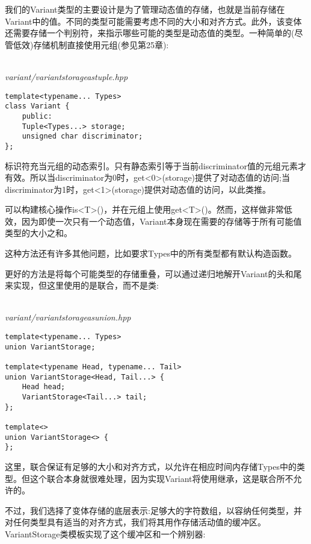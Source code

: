 我们的Variant类型的主要设计是为了管理动态值的存储，也就是当前存储在Variant中的值。不同的类型可能需要考虑不同的大小和对齐方式。此外，该变体还需要存储一个判别符，来指示哪些可能的类型是动态值的类型。一种简单的(尽管低效)存储机制直接使用元组(参见第25章):

\hspace*{\fill} \\ %
\noindent
\textit{variant/variantstorageastuple.hpp}
\begin{lstlisting}[style=styleCXX]
template<typename... Types>
class Variant {
	public:
	Tuple<Types...> storage;
	unsigned char discriminator;
};
\end{lstlisting}

标识符充当元组的动态索引。只有静态索引等于当前discriminator值的元组元素才有效。所以当discriminator为0时，get<0>(storage)提供了对动态值的访问;当discriminator为1时，get<1>(storage)提供对动态值的访问，以此类推。

可以构建核心操作is<T>()，并在元组上使用get<T>()。然而，这样做非常低效，因为即使一次只有一个动态值，Variant本身现在需要的存储等于所有可能值类型的大小之和。

\begin{tcolorbox}[colback=webgreen!5!white,colframe=webgreen!75!black]
\hspace*{0.75cm}这种方法还有许多其他问题，比如要求Types中的所有类型都有默认构造函数。
\end{tcolorbox}

更好的方法是将每个可能类型的存储重叠，可以通过递归地解开Variant的头和尾来实现，但这里使用的是联合，而不是类:

\hspace*{\fill} \\ %
\noindent
\textit{variant/variantstorageasunion.hpp}
\begin{lstlisting}[style=styleCXX]
template<typename... Types>
union VariantStorage;

template<typename Head, typename... Tail>
union VariantStorage<Head, Tail...> {
	Head head;
	VariantStorage<Tail...> tail;
};

template<>
union VariantStorage<> {
};
\end{lstlisting}

这里，联合保证有足够的大小和对齐方式，以允许在相应时间内存储Types中的类型。但这个联合本身就很难处理，因为实现Variant将使用继承，这是联合所不允许的。

不过，我们选择了变体存储的底层表示:足够大的字符数组，以容纳任何类型，并对任何类型具有适当的对齐方式，我们将其用作存储活动值的缓冲区。VariantStorage类模板实现了这个缓冲区和一个辨别器:

